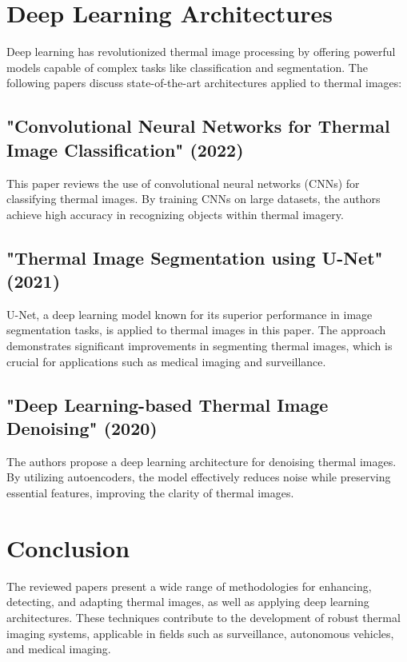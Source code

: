 \documentclass[11pt,a4paper]{report}
\begin{document}
\section{Deep Learning Architectures}

Deep learning has revolutionized thermal image processing by offering powerful models capable of complex tasks like classification and segmentation. The following papers discuss state-of-the-art architectures applied to thermal images:

\subsection{"Convolutional Neural Networks for Thermal Image Classification" (2022)}
This paper reviews the use of convolutional neural networks (CNNs) for classifying thermal images. By training CNNs on large datasets, the authors achieve high accuracy in recognizing objects within thermal imagery.

\subsection{"Thermal Image Segmentation using U-Net" (2021)}
U-Net, a deep learning model known for its superior performance in image segmentation tasks, is applied to thermal images in this paper. The approach demonstrates significant improvements in segmenting thermal images, which is crucial for applications such as medical imaging and surveillance.

\subsection{"Deep Learning-based Thermal Image Denoising" (2020)}
The authors propose a deep learning architecture for denoising thermal images. By utilizing autoencoders, the model effectively reduces noise while preserving essential features, improving the clarity of thermal images.

\section{Conclusion}
The reviewed papers present a wide range of methodologies for enhancing, detecting, and adapting thermal images, as well as applying deep learning architectures. These techniques contribute to the development of robust thermal imaging systems, applicable in fields such as surveillance, autonomous vehicles, and medical imaging.
\end{document}
